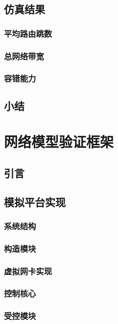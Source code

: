 \documentclass[master]{njuthesis}
\begin{document}
\section{仿真结果}
\subsection{平均路由跳数}
\Blindtext
\subsection{总网络带宽}
\Blindtext
\subsection{容错能力}
\Blindtext
\section{小结}
\blindtext

\chapter{网络模型验证框架}\label{chapter_experiments}
\section{引言}
\Blindtext
\section{模拟平台实现}
\Blindtext
\subsection{系统结构}
\Blindtext
\subsection{构造模块}
\Blindtext
\subsection{虚拟网卡实现}
\Blindtext
\subsection{控制核心}
\Blindtext
\subsection{受控模块}
\Blindtext
\end{document}
